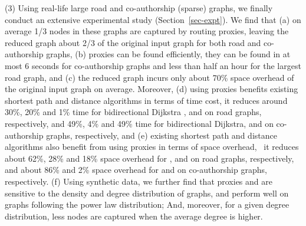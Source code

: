 \stab (3) Using real-life large road and co-authorship (sparse) graphs, we finally conduct an extensive experimental study (Section~\ref{sec-expt}).
We find that (a) on average 1/3 nodes in these graphs are captured by routing proxies, leaving the reduced graph about 2/3 of the original input graph for both road and co-authorship graphs,  (b) proxies can be found efficiently, \eg they can be found in at most 6 seconds for co-authorship graphs and less than half an hour for the largest road graph, and (c) the reduced graph incurs only about 70\% space overhead of the original input graph on average.  Moreover, (d) using proxies benefits existing shortest path and distance algorithms in terms of time cost, \eg it reduces around 30\%, 20\% and 1\% time for  bidirectional Dijkstra \cite{LubyR89}, \arcflag \cite{MohringSSWW05} and \ah \cite{zhu2013shortest} on road graphs, respectively, and 49\%, 4\% and 49\% time for bidirectional Dijkstra, \arcflag and \tnr \cite{arz2013transit} on co-authorship graphs, respectively, %
and (e) existing shortest path and distance algorithms also benefit from using proxies in terms of space overhead, \eg\ it reduces about 62\%, 28\% and 18\% space overhead for \arcflag, \tnr and \ah on road graphs, respectively, and about 86\% and 2\% space overhead for \arcflag and \tnr on co-authorship graphs, respectively. 
%
(f) Using synthetic data, we further find that proxies and \dras are sensitive to the density and degree distribution of graphs, and perform well on graphs following the power law distribution; And, moreover, for a given degree distribution, less nodes are captured when the average degree is higher.








